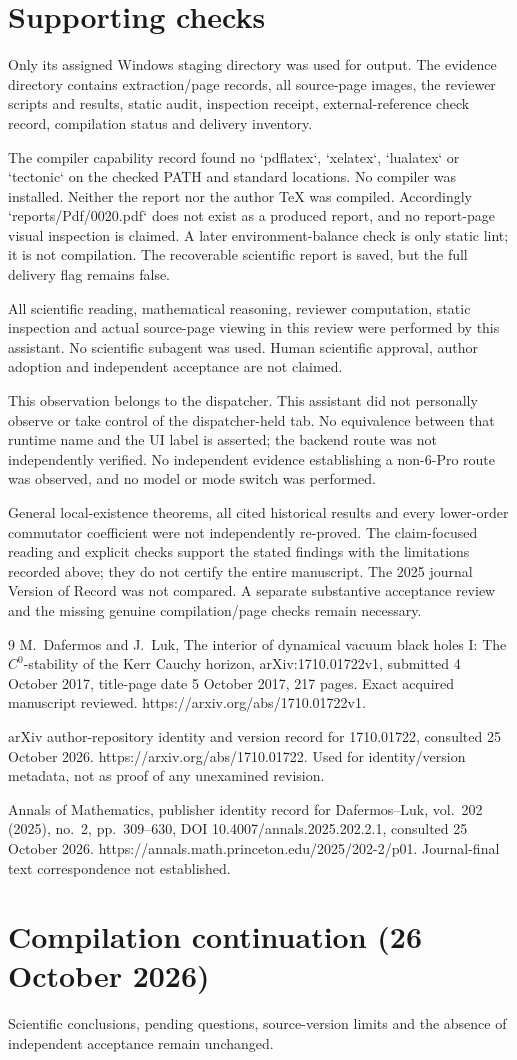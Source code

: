 \documentclass[10pt]{article}
\begin{document}
\section*{Supporting checks}
Only its assigned Windows staging directory was used for output. The evidence directory contains extraction/page records, all source-page images, the reviewer scripts and results, static audit, inspection receipt, external-reference check record, compilation status and delivery inventory.\par
The compiler capability record found no `pdflatex`, `xelatex`, `lualatex` or `tectonic` on the checked PATH and standard locations. No compiler was installed. Neither the report nor the author TeX was compiled. Accordingly `reports/Pdf/0020.pdf` does not exist as a produced report, and no report-page visual inspection is claimed. A later environment-balance check is only static lint; it is not compilation. The recoverable scientific report is saved, but the full delivery flag remains false.\par
All scientific reading, mathematical reasoning, reviewer computation, static inspection and actual source-page viewing in this review were performed by this assistant. No scientific subagent was used. Human scientific approval, author adoption and independent acceptance are not claimed.\par
This observation belongs to the dispatcher. This assistant did not personally observe or take control of the dispatcher-held tab. No equivalence between that runtime name and the UI label is asserted; the backend route was not independently verified. No independent evidence establishing a non-6-Pro route was observed, and no model or mode switch was performed.\par
General local-existence theorems, all cited historical results and every lower-order commutator coefficient were not independently re-proved. The claim-focused reading and explicit checks support the stated findings with the limitations recorded above; they do not certify the entire manuscript. The 2025 journal Version of Record was not compared. A separate substantive acceptance review and the missing genuine compilation/page checks remain necessary.\par
9 M. Dafermos and J. Luk, The interior of dynamical vacuum black holes I: The \(C^0\)-stability of the Kerr Cauchy horizon, arXiv:1710.01722v1, submitted 4 October 2017, title-page date 5 October 2017, 217 pages. Exact acquired manuscript reviewed. https://arxiv.org/abs/1710.01722v1.\par
arXiv author-repository identity and version record for 1710.01722, consulted 25 October 2026. https://arxiv.org/abs/1710.01722. Used for identity/version metadata, not as proof of any unexamined revision.\par
Annals of Mathematics, publisher identity record for Dafermos–Luk, vol. 202 (2025), no. 2, pp. 309–630, DOI 10.4007/annals.2025.202.2.1, consulted 25 October 2026. https://annals.math.princeton.edu/2025/202-2/p01. Journal-final text correspondence not established.\par
\section*{Compilation continuation (26 October 2026)}
Scientific conclusions, pending questions, source-version limits and the absence of independent acceptance remain unchanged.\par
\end{document}
